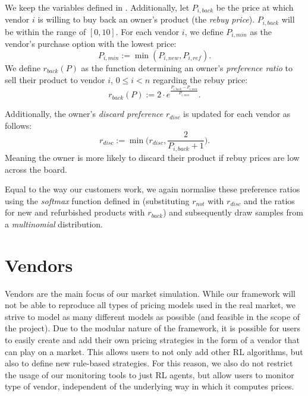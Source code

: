 \begin{definition}\label{def:ownerDecisions}
	We keep the variables defined in . Additionally, let \(P_{i,back}\) be the price at which vendor \(i\) is willing to buy back an owner's product (the \emph{rebuy price}). \(P_{i, back}\) will be within the range of \([0,10]\). For each vendor \(i\), we define \(P_{i,min}\) as the vendor's purchase option with the lowest price:
	\begin{equation}
		P_{i, min} := \min(P_{i, new}, P_{i, ref}).
	\end{equation}
	We define \(r_{back}(P)\) as the function determining an owner's \emph{preference ratio} to sell their product to vendor \(i\), \(0 \leq i < n\) regarding the rebuy price:
	\begin{equation}
		r_{back}(P) := 2 \cdot e^{\frac{P_{i, back} - P_{i, min}}{P_{i, min}}}.
	\end{equation}

	\pagebreak

	\noindent Additionally, the owner's \emph{discard preference} \(r_{disc}\) is updated for each vendor as follows:
	\begin{equation}
		r_{disc} := \min\biggl({r_{disc}, \frac{2}{P_{i, back} + 1}}\biggr).
	\end{equation}
	Meaning the owner is more likely to discard their product if rebuy prices are low across the board.
\end{definition}

Equal to the way our customers work, we again normalise these preference ratios using the \emph{softmax} function defined in  (substituting \(r_{not}\) with \(r_{disc}\) and the ratios for new and refurbished products with \(r_{back}\)) and subsequently draw samples from a \emph{multinomial} distribution.

\section{Vendors}\label{sec:ExplainVendors}

Vendors are the main focus of our market simulation. While our framework will not be able to reproduce all types of pricing models used in the real market, we strive to model as many different models as possible (and feasible in the scope of the project). Due to the modular nature of the framework, it is possible for users to easily create and add their own pricing strategies in the form of a vendor that can play on a market. This allows users to not only add other RL algorithms, but also to define new rule-based strategies. For this reason, we also do not restrict the usage of our monitoring tools to just RL agents, but allow users to monitor type of vendor, independent of the underlying way in which it computes prices.

